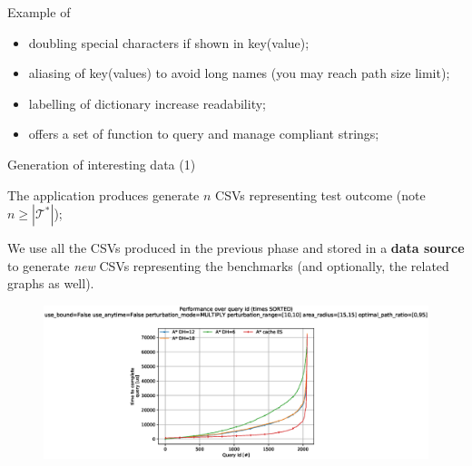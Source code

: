 \begin{frame}{Example of }
    
    \begin{block}{\hphantom{}}
    \end{block}

    \begin{itemize}
        \item doubling special characters if shown in key(value);
        \item aliasing of key(values) to avoid long names (you may reach path size limit);
        \item labelling of dictionary increase readability;
        \item {} offers a set of function to query and manage  compliant strings;
    \end{itemize}
    
\end{frame}

\begin{frame}{Generation of interesting data (1)}
    \begin{block}{\hphantom{}}
        The application produces generate $n$ CSVs representing test outcome (note $n \geq |\mathcal{T}^{*}|$);
    \end{block}

    We use all the CSVs produced in the previous phase and stored in a \textbf{data source} to generate \textit{new} CSVs representing the benchmarks (and optionally, the related graphs as well).

    \begin{figure}
        \centering
        \includegraphics[width=1.0\textwidth]{src/images/example.eps}
    \end{figure}
\end{frame}

